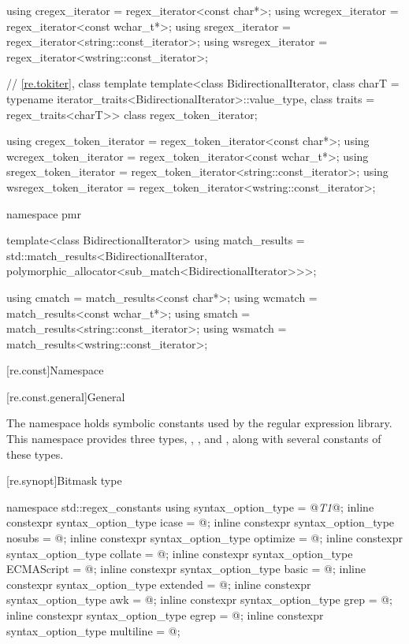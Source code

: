 \begin{codeblock}
{  using cregex_iterator  = regex_iterator<const char*>;
  using wcregex_iterator = regex_iterator<const wchar_t*>;
  using sregex_iterator  = regex_iterator<string::const_iterator>;
  using wsregex_iterator = regex_iterator<wstring::const_iterator>;

  // \ref{re.tokiter}, class template 
  template<class BidirectionalIterator,
            class charT = typename iterator_traits<BidirectionalIterator>::value_type,
            class traits = regex_traits<charT>>
    class regex_token_iterator;

  using cregex_token_iterator  = regex_token_iterator<const char*>;
  using wcregex_token_iterator = regex_token_iterator<const wchar_t*>;
  using sregex_token_iterator  = regex_token_iterator<string::const_iterator>;
  using wsregex_token_iterator = regex_token_iterator<wstring::const_iterator>;

  namespace pmr {
    template<class BidirectionalIterator>
      using match_results =
        std::match_results<BidirectionalIterator,
                           polymorphic_allocator<sub_match<BidirectionalIterator>>>;

    using cmatch  = match_results<const char*>;
    using wcmatch = match_results<const wchar_t*>;
    using smatch  = match_results<string::const_iterator>;
    using wsmatch = match_results<wstring::const_iterator>;
  }
}
\end{codeblock}

[re.const]{Namespace }

[re.const.general]{General}

\pnum
{}%
The namespace  holds
symbolic constants used by the regular expression library.  This
namespace provides three types, ,
, and , along with several
constants of these types.

[re.synopt]{Bitmask type }
%
%
\begin{codeblock}
namespace std::regex_constants {
  using syntax_option_type = @\textit{T1}@;
  inline constexpr syntax_option_type icase = @\unspec@;
  inline constexpr syntax_option_type nosubs = @\unspec@;
  inline constexpr syntax_option_type optimize = @\unspec@;
  inline constexpr syntax_option_type collate = @\unspec@;
  inline constexpr syntax_option_type ECMAScript = @\unspec@;
  inline constexpr syntax_option_type basic = @\unspec@;
  inline constexpr syntax_option_type extended = @\unspec@;
  inline constexpr syntax_option_type awk = @\unspec@;
  inline constexpr syntax_option_type grep = @\unspec@;
  inline constexpr syntax_option_type egrep = @\unspec@;
  inline constexpr syntax_option_type multiline = @\unspec@;
}
\end{codeblock}

